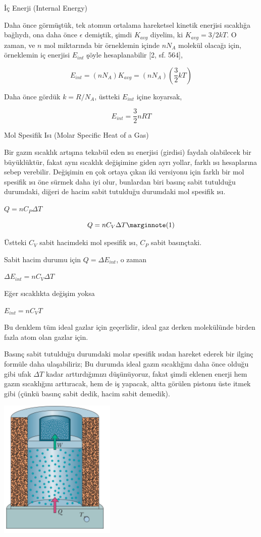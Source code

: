\documentclass[12pt,fleqn]{article}\usepackage{../../common}
\begin{document}
İç Enerji (Internal Energy)

Daha önce görmüştük, tek atomun ortalama hareketsel kinetik enerjisi
sıcaklığa bağlıydı, ona daha önce $\epsilon$ demiştik, şimdi $K_{avg}$
diyelim, ki $K_{avg} = 3/2 k T$. O zaman, ve $n$ mol miktarında bir
örneklemin içinde $n N_A$ molekül olacağı için, örneklemin iç
enerjisi $E_{int}$ şöyle hesaplanabilir [2, sf. 564],

$$
E_{int} = (n N_A) K_{avg} = (n N_A) (\frac{3}{2} k T)
$$

Daha önce gördük $k = R/N_A$, üstteki $E_{int}$ içine koyarsak,

$$
E_{int} = \frac{3}{2} n R T
$$

Mol Spesifik Isı (Molar Specific Heat of a Gas)

Bir gazın sıcaklık artışına tekabül eden ısı enerjisi (girdisi) faydalı
olabilecek bir büyüklüktür, fakat aynı sıcaklık değişimine giden ayrı yollar,
farklı ısı hesaplarına sebep verebilir. Değişimin en çok ortaya çıkan iki
versiyonu için farklı bir mol spesifik ısı öne sürmek daha iyi olur, bunlardan
biri basınç sabit tutulduğu durumdaki, diğeri de hacim sabit tutulduğu
durumdaki mol spesifik ısı.

$Q = n C_P \Delta T$

$$
Q = n C_V \Delta T
\mlabel{1}
$$

Üstteki $C_V$ sabit hacimdeki mol spesifik ısı, $C_P$ sabit basınçtaki.

Sabit hacim durumu için $Q = \Delta E_{int}$, o zaman 

$\Delta E_{int} = n C_V \Delta T$

Eğer sıcaklıkta değişim yoksa 

$E_{int} = n C_V T$

Bu denklem tüm ideal gazlar için geçerlidir, ideal gaz derken molekülünde birden
fazla atom olan gazlar için.

Basınç sabit tutulduğu durumdaki molar spesifik ısıdan hareket ederek bir ilginç
formüle daha ulaşabiliriz; Bu durumda ideal gazın sıcaklığını daha önce olduğu
gibi ufak $\Delta T$ kadar arttırdığımızı düşünüyoruz, fakat şimdi eklenen
enerji hem gazın sıcaklığını arttıracak, hem de iş yapacak, altta görülen
pistonu üste itmek gibi (çünkü basınç sabit dedik, hacim sabit demedik). 

\includegraphics[width=15em]{phy_005_basics_06.png}
\end{document}
